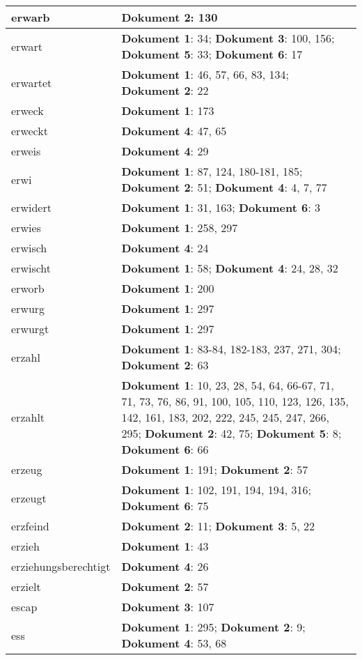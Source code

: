 \documentclass[a5paper]{article}
\begin{document}
\begin{longtable}[l]{|l|p{3in}|}
\hline
erwarb & \textbf{Dokument 2}: 130 \\
\hline
erwart & \textbf{Dokument 1}: 34; \textbf{Dokument 3}: 100, 156; \textbf{Dokument 5}: 33; \textbf{Dokument 6}: 17 \\
\hline
erwartet & \textbf{Dokument 1}: 46, 57, 66, 83, 134; \textbf{Dokument 2}: 22 \\
\hline
erweck & \textbf{Dokument 1}: 173 \\
\hline
erweckt & \textbf{Dokument 4}: 47, 65 \\
\hline
erweis & \textbf{Dokument 4}: 29 \\
\hline
erwi & \textbf{Dokument 1}: 87, 124, 180-181, 185; \textbf{Dokument 2}: 51; \textbf{Dokument 4}: 4, 7, 77 \\
\hline
erwidert & \textbf{Dokument 1}: 31, 163; \textbf{Dokument 6}: 3 \\
\hline
erwies & \textbf{Dokument 1}: 258, 297 \\
\hline
erwisch & \textbf{Dokument 4}: 24 \\
\hline
erwischt & \textbf{Dokument 1}: 58; \textbf{Dokument 4}: 24, 28, 32 \\
\hline
erworb & \textbf{Dokument 1}: 200 \\
\hline
erwurg & \textbf{Dokument 1}: 297 \\
\hline
erwurgt & \textbf{Dokument 1}: 297 \\
\hline
erzahl & \textbf{Dokument 1}: 83-84, 182-183, 237, 271, 304; \textbf{Dokument 2}: 63 \\
\hline
erzahlt & \textbf{Dokument 1}: 10, 23, 28, 54, 64, 66-67, 71, 71, 73, 76, 86, 91, 100, 105, 110, 123, 126, 135, 142, 161, 183, 202, 222, 245, 245, 247, 266, 295; \textbf{Dokument 2}: 42, 75; \textbf{Dokument 5}: 8; \textbf{Dokument 6}: 66 \\
\hline
erzeug & \textbf{Dokument 1}: 191; \textbf{Dokument 2}: 57 \\
\hline
erzeugt & \textbf{Dokument 1}: 102, 191, 194, 194, 316; \textbf{Dokument 6}: 75 \\
\hline
erzfeind & \textbf{Dokument 2}: 11; \textbf{Dokument 3}: 5, 22 \\
\hline
erzieh & \textbf{Dokument 1}: 43 \\
\hline
erziehungsberechtigt & \textbf{Dokument 4}: 26 \\
\hline
erzielt & \textbf{Dokument 2}: 57 \\
\hline
escap & \textbf{Dokument 3}: 107 \\
\hline
ess & \textbf{Dokument 1}: 295; \textbf{Dokument 2}: 9; \textbf{Dokument 4}: 53, 68 \\

\end{longtable}
\end{document}
